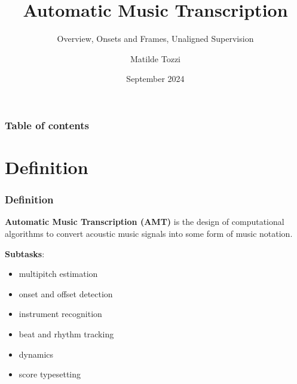 \documentclass{beamer}
\title{Automatic Music Transcription}
\subtitle{Overview, Onsets and Frames, Unaligned Supervision}
\author{Matilde Tozzi}
\institute[]{Ferienakademie}
\date[September 2024]{September 2024}
\newcommand{\emp}[1]{\textcolor{tum}{\textbf{#1}}}
\begin{document}
\beamertemplatenavigationsymbolsempty

\begin{frame}
	\titlepage
\end{frame}

\begin{frame}
	\frametitle{Table of contents}
	\tableofcontents
\end{frame}


\section{Definition}
\begin{frame}
	\frametitle{Definition}
	\begin{block}{}
		\emp{Automatic Music Transcription (AMT)} is the design of computational algorithms to convert acoustic music signals into some form of music notation. \cite{Overview}
	\end{block}

	\emp{Subtasks}:
	\begin{itemize}
		\item multipitch estimation
		\item onset and offset detection
		\item instrument recognition
		\item beat and rhythm tracking
		\item dynamics
		\item score typesetting
	\end{itemize}
\end{frame}
\end{document}
